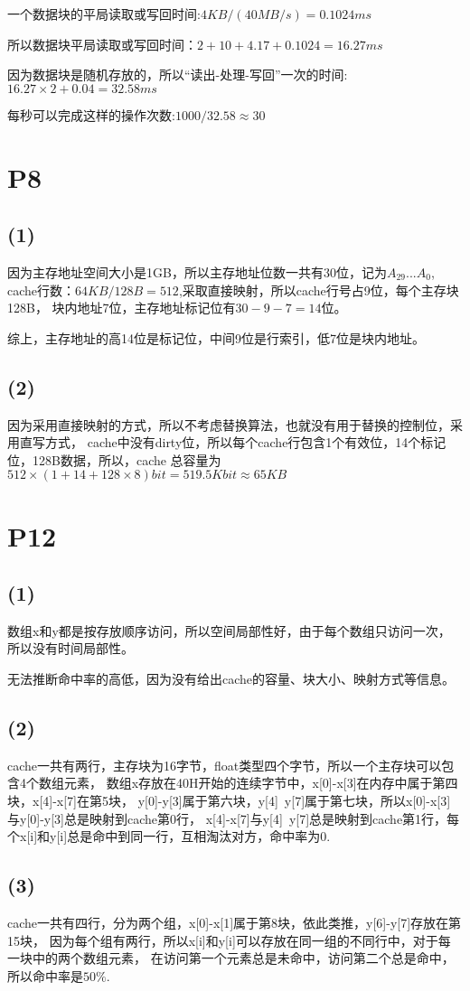 \documentclass{article}
\begin{document}
一个数据块的平局读取或写回时间:$4KB/(40MB/s)=0.1024ms$

所以数据块平局读取或写回时间：$2+10+4.17+0.1024=16.27ms$

因为数据块是随机存放的，所以“读出-处理-写回”一次的时间:$16.27\times 2+0.04=32.58ms$

每秒可以完成这样的操作次数:$1000/32.58\approx 30$
\section{P8}
\subsection*{(1)}
因为主存地址空间大小是1GB，所以主存地址位数一共有30位，记为$A_{29}...A_{0}$,
cache行数：$64KB/128B=512$,采取直接映射，所以cache行号占9位，每个主存块128B，
块内地址7位，主存地址标记位有$30-9-7=14$位。

综上，主存地址的高14位是标记位，中间9位是行索引，低7位是块内地址。
\subsection*{(2)}
因为采用直接映射的方式，所以不考虑替换算法，也就没有用于替换的控制位，采用直写方式，
cache中没有dirty位，所以每个cache行包含1个有效位，14个标记位，128B数据，所以，cache
总容量为$512\times (1+14+128\times 8)bit=519.5Kbit\approx 65KB$
\section{P12}
\subsection*{(1)}
数组x和y都是按存放顺序访问，所以空间局部性好，由于每个数组只访问一次，所以没有时间局部性。

无法推断命中率的高低，因为没有给出cache的容量、块大小、映射方式等信息。
\subsection*{(2)}
cache一共有两行，主存块为16字节，float类型四个字节，所以一个主存块可以包含4个数组元素，
数组x存放在40H开始的连续字节中，x[0]-x[3]在内存中属于第四块，x[4]-x[7]在第5块，
y[0]-y[3]属于第六块，y[4]~y[7]属于第七块，所以x[0]-x[3]与y[0]-y[3]总是映射到cache第0行，
x[4]-x[7]与y[4]~y[7]总是映射到cache第1行，每个x[i]和y[i]总是命中到同一行，互相淘汰对方，命中率为0.
\subsection*{(3)}
cache一共有四行，分为两个组，x[0]-x[1]属于第8块，依此类推，y[6]-y[7]存放在第15块，
因为每个组有两行，所以x[i]和y[i]可以存放在同一组的不同行中，对于每一块中的两个数组元素，
在访问第一个元素总是未命中，访问第二个总是命中，所以命中率是$50\%$.
\end{document}
